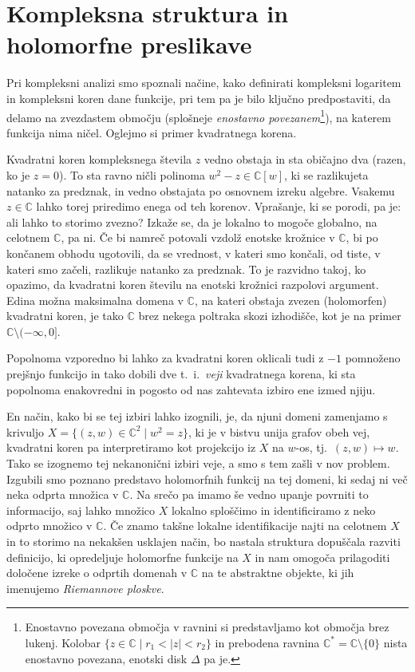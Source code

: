 \documentclass[mat1]{fmfdelo}
\numberwithin{equation}{section}
\newcommand{\C}{\mathbb C}
\newcommand{\CM}{\mathbb C ^*}
\newcommand{\abs}[1]{\left\lvert #1 \right\rvert}
\newcommand{\ti}{t.~i.\ }
\newcommand{\tj}{tj.\ }
\theoremstyle{definition}
\begin{document}
\section{Kompleksna struktura in holomorfne preslikave} \label{riemannove ploskve}
Pri kompleksni analizi smo spoznali načine, kako definirati kompleksni logaritem in kompleksni koren dane funkcije, pri tem pa je bilo ključno predpostaviti, da delamo na zvezdastem območju (splošneje \emph{enostavno povezanem}\footnote{Enostavno povezana območja v ravnini si predstavljamo kot območja brez lukenj. Kolobar $\{z \in \C \mid r_1 < \abs{z} < r_2\}$ in prebodena ravnina $\CM = \C\setminus\{0\}$ nista enostavno povezana, enotski disk $\Delta$ pa je.}), na katerem funkcija nima ničel. Oglejmo si primer kvadratnega korena.

Kvadratni koren kompleksnega števila $z$ vedno obstaja in sta običajno dva (razen, ko je $z = 0$). To sta ravno ničli polinoma $w^2 - z \in \C[w]$, ki se razlikujeta natanko za predznak, in vedno obstajata po osnovnem izreku algebre. Vsakemu $z \in \C$ lahko torej priredimo enega od teh korenov. Vprašanje, ki se porodi, pa je: ali lahko to storimo zvezno? Izkaže se, da je lokalno to mogoče globalno, na celotnem $\C$, pa ni. Če bi namreč potovali vzdolž enotske krožnice v $\C$, bi po končanem obhodu ugotovili, da se vrednost, v kateri smo končali, od tiste, v kateri smo začeli, razlikuje natanko za predznak. To je razvidno takoj, ko opazimo, da kvadratni koren številu na enotski krožnici razpolovi argument. Edina možna maksimalna domena v $\C$, na kateri obstaja zvezen (holomorfen) kvadratni koren, je tako $\C$ brez nekega poltraka skozi izhodišče, kot je na primer $\C \setminus (-\infty, 0]$.

Popolnoma vzporedno bi lahko za kvadratni koren oklicali tudi z $-1$ pomnoženo prejšnjo funkcijo in tako dobili dve \ti \emph{veji} kvadratnega korena, ki sta popolnoma enakovredni in pogosto od nas zahtevata izbiro ene izmed njiju. 

En način, kako bi se tej izbiri lahko izognili, je, da njuni domeni zamenjamo s krivuljo $X = \{(z,w) \in \C^2 \mid w^2 = z\}$, ki je v bistvu unija grafov obeh vej, kvadratni koren pa interpretiramo kot projekcijo iz $X$ na $w$-os, \tj $(z,w) \mapsto w$. Tako se izognemo tej nekanonični izbiri veje, a smo s tem zašli v nov problem. Izgubili smo poznano predstavo holomorfnih funkcij na tej domeni, ki sedaj ni več neka odprta množica v $\C$. Na srečo pa imamo še vedno upanje povrniti to informacijo, saj lahko množico $X$ lokalno sploščimo in identificiramo z neko odprto množico v $\C$. Če znamo takšne lokalne identifikacije najti na celotnem $X$ in to storimo na nekakšen usklajen način, bo nastala struktura dopuščala razviti definicijo, ki opredeljuje holomorfne funkcije na $X$ in nam omogoča prilagoditi določene izreke o odprtih domenah v $\C$ na te abstraktne objekte, ki jih imenujemo \emph{Riemannove ploskve}.  
\end{document}
